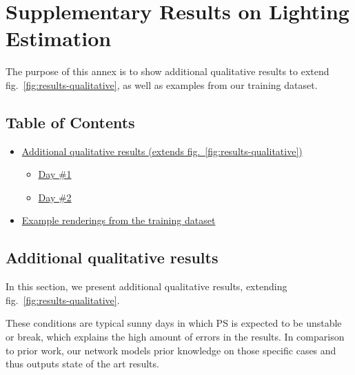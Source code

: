 \chapter{Supplementary Results on Lighting Estimation}     %
\label{annex3}

\graphicspath{{annex3_figures/}}

The purpose of this annex is to show additional qualitative results
to extend fig.~\ref{fig:results-qualitative}, as well as examples from our training dataset.

\hypertarget{an3-table-of-contents}{%
\section*{Table of Contents}\label{an3-table-of-contents}}

\begin{itemize}
\item\hyperlink{extraresults}{Additional qualitative results (extends
fig.~\ref{fig:results-qualitative})}
\begin{itemize}
\tightlist
\item
  \protect\hyperlink{extraresultsd2}{Day \#1}
\item
  \protect\hyperlink{extraresultsd2}{Day \#2}
\end{itemize}
\item\hyperlink{trainingrenders}{Example renderings from the training
dataset}
\end{itemize}

\protect\hypertarget{extraresults}{}{}

\hypertarget{additional-qualitative-results}{%
\section{Additional qualitative
results}\label{additional-qualitative-results}}

In this section, we present additional qualitative results, extending
fig.~\ref{fig:results-qualitative}.

These conditions are typical sunny days in which PS is expected to be
unstable or break, which explains the high amount of errors in the
results. In comparison to prior work, our network models prior knowledge
on those specific cases and thus outputs state of the art results.

\clearpage

